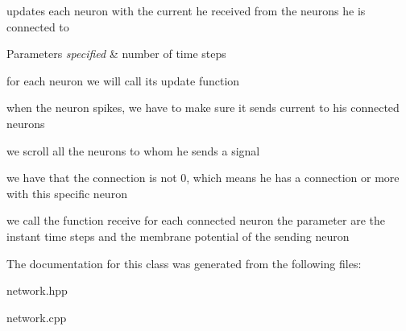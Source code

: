 updates each neuron with the current he received from the neurons he is connected to 


\begin{DoxyParams}{Parameters}
{\em specified} & number of time steps \\
\hline
\end{DoxyParams}
for each neuron we will call its update function

when the neuron spikes, we have to make sure it sends current to his connected neurons

we scroll all the neurons to whom he sends a signal

we have that the connection is not 0, which means he has a connection or more with this specific neuron

we call the function receive for each connected neuron the parameter are the instant time steps and the membrane potential of the sending neuron

The documentation for this class was generated from the following files\-:\begin{DoxyCompactItemize}
\item 
network.\-hpp\item 
network.\-cpp\end{DoxyCompactItemize}
